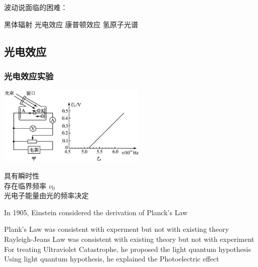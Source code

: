 \begin{frame} 
    波动说面临的困难：
    \begin{itemize}
        \Item  黑体辐射
        \Item  光电效应
        \Item  康普顿效应
        \Item  氢原子光谱
    \end{itemize}
\end{frame}

\subsection{光电效应}

\begin{frame} 
    \frametitle{光电效应实验}   
    \begin{center}
       \includegraphics[width=0.53\textwidth]{figs/2021-12-02-16-01-21.png}
   \end{center}  
   {\Bullet} 具有瞬时性 \\
   {\Bullet} 存在临界频率 $\nu_0$ \\
   {\Bullet} 光电子能量由光的频率决定
\end{frame}  

\begin{frame} 
    In 1905, Einstein considered the derivation of Planck's Law  \\
    \begin{itemize}
        \Item  Plank’s Law was consistent with experment but not with existing theory
        \Item  Rayleigh-Jeans Law was consistent with existing theory but not with experiment
        \Item  For treating Ultraviolet Catastrophe, he proposed the light quantum hypothesis
        \Item  Using light quantum hypothesis, he explained the Photoelectric effect
    \end{itemize}
\end{frame}

